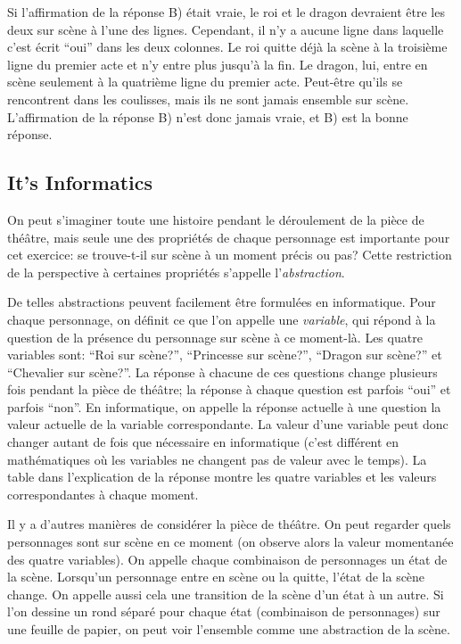 \documentclass[a4paper,11pt]{report}
\begin{document}
Si l’affirmation de la réponse B) était vraie, le roi et le dragon devraient être les deux sur scène à l’une des lignes. Cependant, il n’y a aucune ligne dans laquelle c’est écrit “oui” dans les deux colonnes. Le roi quitte déjà la scène à la troisième ligne du premier acte et n’y entre plus jusqu’à la fin. Le dragon, lui, entre en scène seulement à la quatrième ligne du premier acte. Peut-être qu’ils se rencontrent dans les coulisses, mais ils ne sont jamais ensemble sur scène. L’affirmation de la réponse B) n’est donc jamais vraie, et B) est la bonne réponse.


\subsection*{It’s Informatics}

On peut s’imaginer toute une histoire pendant le déroulement de la pièce de théâtre, mais seule une des propriétés de chaque personnage est importante pour cet exercice: se trouve-t-il sur scène à un moment précis ou pas? Cette restriction de la perspective à certaines propriétés s’appelle l’\emph{abstraction}.

De telles abstractions peuvent facilement être formulées en informatique. Pour chaque personnage, on définit ce que l’on appelle une \emph{variable}, qui répond à la question de la présence du personnage sur scène à ce moment-là. Les quatre variables sont: “Roi sur scène?”, “Princesse sur scène?”, “Dragon sur scène?” et “Chevalier sur scène?”. La réponse à chacune de ces questions change plusieurs fois pendant la pièce de théâtre; la réponse à chaque question est parfois “oui” et parfois “non”. En informatique, on appelle la réponse actuelle à une question la valeur actuelle de la variable correspondante. La valeur d’une variable peut donc changer autant de fois que nécessaire en informatique (c’est différent en mathématiques où les variables ne changent pas de valeur avec le temps). La table dans l’explication de la réponse montre les quatre variables et les valeurs correspondantes à chaque moment.

Il y a d’autres manières de considérer la pièce de théâtre. On peut regarder quels personnages sont sur scène en ce moment (on observe alors la valeur momentanée des quatre variables). On appelle chaque combinaison de personnages un état de la scène. Lorsqu’un personnage entre en scène ou la quitte, l’état de la scène change. On appelle aussi cela une transition de la scène d’un état à un autre. Si l’on dessine un rond séparé pour chaque état (combinaison de personnages) sur une feuille de papier, on peut voir l’ensemble comme une abstraction de la scène.
\end{document}
